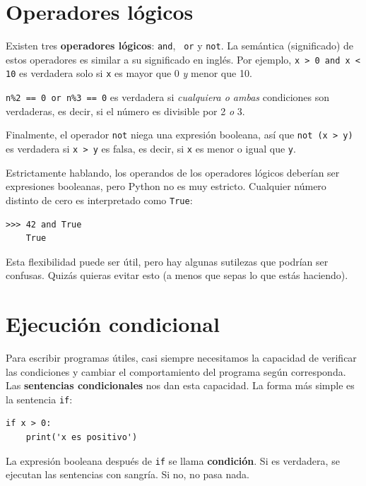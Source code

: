 \documentclass[10pt]{book}
\begin{document}
\section {Operadores lógicos}

Existen tres {\bf operadores lógicos}: {\tt and}, {\tt
or} y {\tt not}.  La semántica (significado) de estos operadores es
similar a su significado en inglés.  Por ejemplo,
{\tt x > 0 and x < 10} es verdadera solo si {\tt x} es mayor que 0
{\em y} menor que 10.

{\tt n\%2 == 0 or n\%3 == 0} es verdadera si {\em cualquiera o ambas}
condiciones son verdaderas, es decir, si el número es divisible por 2 {\em o}
3.

Finalmente, el operador {\tt not} niega una expresión
booleana, así que {\tt not (x > y)} es verdadera si {\tt x > y} es falsa,
es decir, si {\tt x} es menor o igual que {\tt y}.

Estrictamente hablando, los operandos de los operadores lógicos deberían ser
expresiones booleanas, pero Python no es muy estricto.
Cualquier número distinto de cero es interpretado como {\tt True}:

\begin{verbatim}
>>> 42 and True
    True
\end{verbatim}
%
Esta flexibilidad puede ser útil, pero hay algunas sutilezas
que podrían ser confusas.  Quizás quieras evitar esto (a menos que
sepas lo que estás haciendo).


\section{Ejecución condicional}
\label{conditional.execution}

Para escribir programas útiles, casi siempre necesitamos la capacidad
de verificar las condiciones y cambiar el comportamiento del programa
según corresponda.  Las {\bf sentencias condicionales} nos dan esta capacidad.  La
forma más simple es la sentencia {\tt if}:

\begin{verbatim}
if x > 0:
    print('x es positivo')
\end{verbatim}
%
La expresión booleana después de {\tt if} se
llama {\bf condición}.  Si es verdadera, se ejecutan las sentencias
con sangría.  Si no, no pasa nada.
\end{document}
